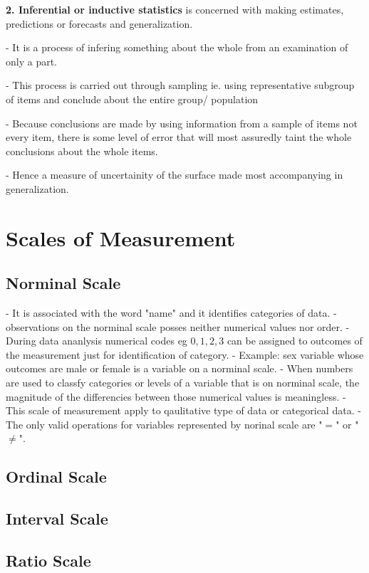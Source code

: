 \documentclass[12pt,a4paper]{article}
\begin{document}
\textbf{2. Inferential or inductive statistics} is concerned with making estimates, predictions or forecasts and generalization.

- It is  a process of infering something about the whole from an examination of only a part.

- This process is carried out through sampling ie. using representative subgroup of items and conclude about the entire group/ population

- Because conclusions are made by using information from a sample of items not every item, there is some level of error that will most assuredly taint the whole conclusions about the whole items.

- Hence a measure of uncertainity of the surface made most accompanying in generalization.

\section{Scales of Measurement}

\subsection{Norminal Scale}
- It is associated with the word "name" and it identifies categories of data.
- observations on the norminal scale posses neither numerical values nor order.
- During data ananlysis numerical codes eg $0, 1, 2, 3$ can be assigned to outcomes of the measurement just for identification of category.
- Example: sex variable whose outcomes are male or female is a variable on a norminal scale.
- When numbers are used to classfy categories or levels of a variable that is on norminal scale, the magnitude of the differencies between those numerical values is meaningless.
-This scale of measurement apply to qaulitative type of data or categorical data.
- The only valid operations for variables represented by norinal scale are "$=$" or "$\neq$".
\subsection{Ordinal Scale}
\subsection{Interval Scale}
\subsection{Ratio Scale}
\end{document}
